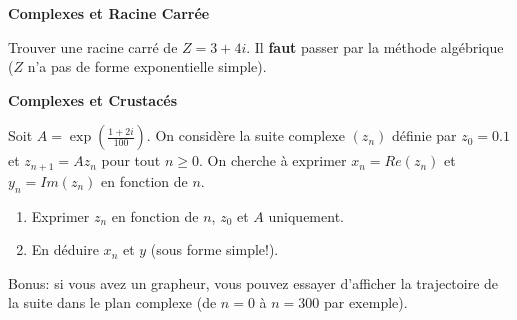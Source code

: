 \documentclass[a4paper,12pt]{article}\usepackage[]{graphicx}\usepackage[]{color}
\begin{document}
\Exo \textbf{Complexes et Racine Carrée}

Trouver une racine carré de $Z = 3+4i$. Il \textbf{faut} passer par la méthode algébrique ($Z$ n'a pas de forme exponentielle simple).

\Exo \textbf{Complexes et Crustacés}

Soit $\displaystyle A = \exp\left( \frac{1 + 2i}{100} \right)$. On considère la suite complexe $(z_n)$ définie par $z_0 = 0.1$ et $z_{n+1} = A z_n$ pour tout $n \geq 0$.
On cherche à exprimer $x_n = Re(z_n)$ et $y_n = Im(z_n)$ en fonction de $n$. 
\begin{enumerate}
\item Exprimer $z_n$ en fonction de $n$, $z_0$ et $A$ uniquement. 
\item En déduire $x_n$ et $y$ (sous forme simple!). 
\end{enumerate}


Bonus: si vous avez un grapheur, vous pouvez essayer d'afficher la trajectoire de la suite dans le plan complexe (de $n=0$ à $n=300$ par exemple). 
\end{document}
